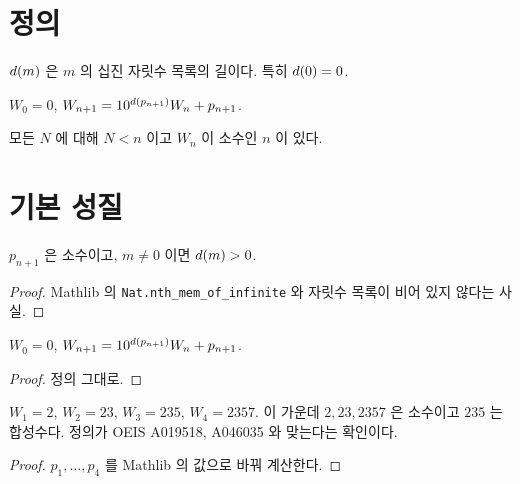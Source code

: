 \section{정의}

\begin{definition}[자릿수]
  \label{def:digitsLen}
  \leanok
  \(d(m)\) 은 \(m\) 의 십진 자릿수 목록의 길이다. 특히 \(d(0) = 0\).
\end{definition}

\begin{definition}
  \label{def:W}
  \leanok
  \(W_0 = 0\), \(W_{n+1} = 10^{d(p_{n+1})} W_n + p_{n+1}\).
\end{definition}

\begin{definition}[목표 명제]
  \label{def:SWInfinitude}
  \leanok
  모든 \(N\) 에 대해 \(N < n\) 이고 \(W_n\) 이 소수인 \(n\) 이 있다.
\end{definition}

\section{기본 성질}

\begin{lemma}
  \label{lem:basic-primes}
  \leanok
  \(p_{n+1}\) 은 소수이고, \(m \ne 0\) 이면 \(d(m) > 0\).
\end{lemma}
\begin{proof}
  \leanok
  Mathlib 의 \texttt{Nat.nth\_mem\_of\_infinite} 와 자릿수 목록이 비어 있지 않다는 사실.
\end{proof}

\begin{lemma}[점화식]
  \label{lem:W-rec}
  \leanok
  \(W_0 = 0\), \(W_{n+1} = 10^{d(p_{n+1})} W_n + p_{n+1}\).
\end{lemma}
\begin{proof}
  \leanok
  정의 그대로.
\end{proof}

\begin{lemma}[처음 네 항, B1]
  \label{lem:W-small}
  \leanok
  \(W_1 = 2\), \(W_2 = 23\), \(W_3 = 235\), \(W_4 = 2357\). 이 가운데 \(2, 23, 2357\) 은 소수이고 \(235\) 는 합성수다.
  정의가 OEIS A019518, A046035 와 맞는다는 확인이다.
\end{lemma}
\begin{proof}
  \leanok
  \(p_1, \dots, p_4\) 를 Mathlib 의 값으로 바꿔 계산한다.
\end{proof}

